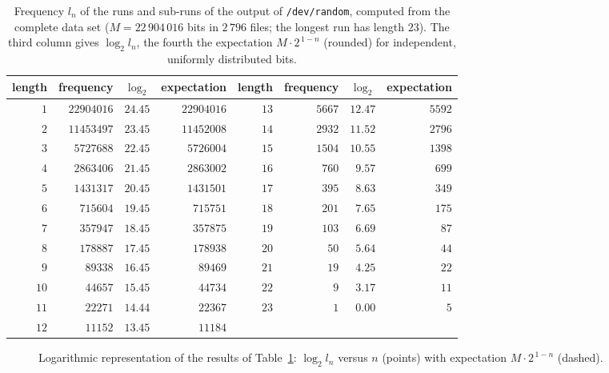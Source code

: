 \documentclass[11pt,a4paper]{scrartcl}
\theoremstyle{plain}
\theoremstyle{definition}
\theoremstyle{remark}
\begin{document}
\begin{table}[htbp]
\centering
\begin{tabular}{rrrrrrrr}
\toprule
length & frequency & $\log_2$ & expectation & length & frequency & $\log_2$ & expectation\\
\midrule
$1$&$22904016$&$24.45$&$22904016$&$13$&$5667$&$12.47$&$5592$\\
$2$&$11453497$&$23.45$&$11452008$&$14$&$2932$&$11.52$&$2796$\\
$3$&$5727688$&$22.45$&$5726004$&$15$&$1504$&$10.55$&$1398$\\
$4$&$2863406$&$21.45$&$2863002$&$16$&$760$&$9.57$&$699$\\
$5$&$1431317$&$20.45$&$1431501$&$17$&$395$&$8.63$&$349$\\
$6$&$715604$&$19.45$&$715751$&$18$&$201$&$7.65$&$175$\\
$7$&$357947$&$18.45$&$357875$&$19$&$103$&$6.69$&$87$\\
$8$&$178887$&$17.45$&$178938$&$20$&$50$&$5.64$&$44$\\
$9$&$89338$&$16.45$&$89469$&$21$&$19$&$4.25$&$22$\\
$10$&$44657$&$15.45$&$44734$&$22$&$9$&$3.17$&$11$\\
$11$&$22271$&$14.44$&$22367$&$23$&$1$&$0.00$&$5$\\
$12$&$11152$&$13.45$&$11184$& & & &\\
\bottomrule
\end{tabular}
\caption{Frequency $l_n$ of the runs and sub-runs of the output of
\texttt{/dev/random}, computed from the complete data set
($M=22\,904\,016$ bits in $2\,796$ files; the longest run has length
$23$). The third column gives $\log_2 l_n$, the fourth the expectation
$M\cdot 2^{\,1-n}$ (rounded) for independent, uniformly distributed
bits.}
\label{tab:haeufigkeiten}
\end{table}

\begin{figure}[htbp]
\centering
{}
\caption{Logarithmic representation of the results of
Table~\ref{tab:haeufigkeiten}: $\log_2 l_n$ versus $n$ (points) with
expectation $M\cdot 2^{\,1-n}$ (dashed).}
\label{fig:haeufigkeiten}
\end{figure}
\end{document}
